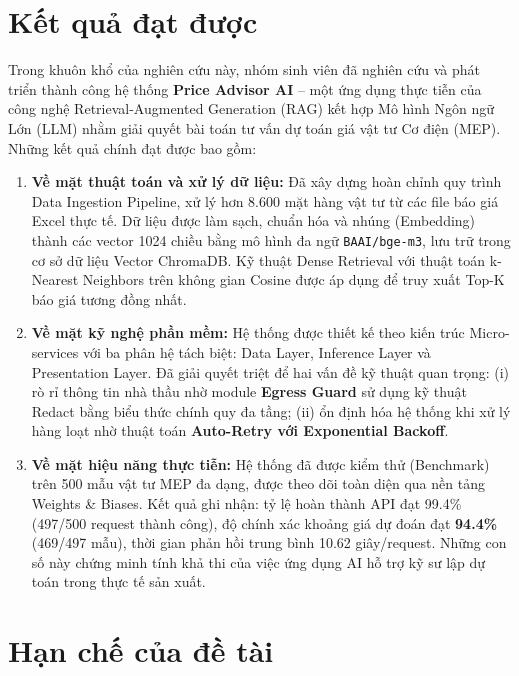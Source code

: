 
\section*{Kết quả đạt được}

Trong khuôn khổ của nghiên cứu này, nhóm sinh viên đã nghiên cứu và phát triển thành công hệ thống \textbf{Price Advisor AI} -- một ứng dụng thực tiễn của công nghệ Retrieval-Augmented Generation (RAG) kết hợp Mô hình Ngôn ngữ Lớn (LLM) nhằm giải quyết bài toán tư vấn dự toán giá vật tư Cơ điện (MEP). Những kết quả chính đạt được bao gồm:

\begin{enumerate}
    \item \textbf{Về mặt thuật toán và xử lý dữ liệu:} Đã xây dựng hoàn chỉnh quy trình Data Ingestion Pipeline, xử lý hơn 8.600 mặt hàng vật tư từ các file báo giá Excel thực tế. Dữ liệu được làm sạch, chuẩn hóa và nhúng (Embedding) thành các vector 1024 chiều bằng mô hình đa ngữ \texttt{BAAI/bge-m3}, lưu trữ trong cơ sở dữ liệu Vector ChromaDB. Kỹ thuật Dense Retrieval với thuật toán k-Nearest Neighbors trên không gian Cosine được áp dụng để truy xuất Top-K báo giá tương đồng nhất.

    \item \textbf{Về mặt kỹ nghệ phần mềm:} Hệ thống được thiết kế theo kiến trúc Micro-services với ba phân hệ tách biệt: Data Layer, Inference Layer và Presentation Layer. Đã giải quyết triệt để hai vấn đề kỹ thuật quan trọng: (i) rò rỉ thông tin nhà thầu nhờ module \textbf{Egress Guard} sử dụng kỹ thuật Redact bằng biểu thức chính quy đa tầng; (ii) ổn định hóa hệ thống khi xử lý hàng loạt nhờ thuật toán \textbf{Auto-Retry với Exponential Backoff}.

    \item \textbf{Về mặt hiệu năng thực tiễn:} Hệ thống đã được kiểm thử (Benchmark) trên 500 mẫu vật tư MEP đa dạng, được theo dõi toàn diện qua nền tảng Weights \& Biases. Kết quả ghi nhận: tỷ lệ hoàn thành API đạt 99.4\% (497/500 request thành công), độ chính xác khoảng giá dự đoán đạt \textbf{94.4\%} (469/497 mẫu), thời gian phản hồi trung bình 10.62 giây/request. Những con số này chứng minh tính khả thi của việc ứng dụng AI hỗ trợ kỹ sư lập dự toán trong thực tế sản xuất.
\end{enumerate}

\section*{Hạn chế của đề tài}

